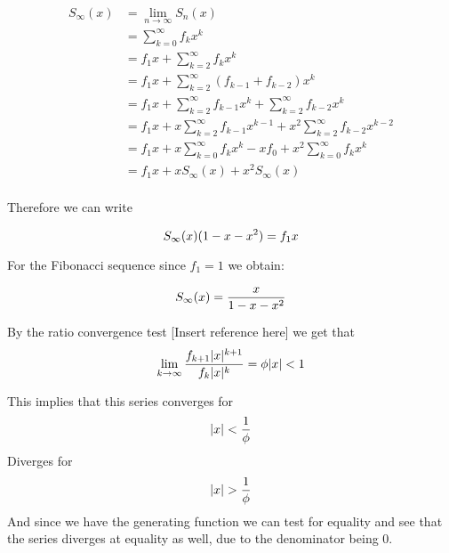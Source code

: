 \documentclass[a4paper]{article}
\begin{document}
\begin{equation}
\begin{split}
S_{\infty}(x) & = \lim_{n \to \infty} S_n(x) \\
 & = \sum_{k=0}^{\infty} f_k x^k \\
 & = f_1 x + \sum_{k=2}^{\infty} f_k x^k \\
 & = f_1 x + \sum_{k=2}^{\infty} (f_{k-1} + f_{k-2}) x^k \\ 
 & = f_1 x + \sum_{k=2}^{\infty} f_{k-1} x^k + \sum_{k=2}^{\infty} f_{k-2} x^k \\
  & = f_1 x + x \sum_{k=2}^{\infty} f_{k-1} x^{k-1} + x^2 \sum_{k=2}^{\infty} f_{k-2} x^{k-2} \\
  & = f_1 x + x \sum_{k=0}^{\infty} f_{k} x^{k} - x f_0 + x^2 \sum_{k=0}^{\infty} f_{k} x^{k} \\ 
  & = f_1 x + x S_{\infty}(x) + x^2 S_{\infty}(x) \\ 
\end{split}
\end{equation}

Therefore we can write 

\begin{equation}
S_{\infty}(x) (1 - x -x^2 ) = f_1 x \\ 
\end{equation}

For the Fibonacci sequence since $f_1 = 1$ we obtain:

\begin{equation}
S_{\infty}(x) = \frac{x}{1 - x -x^2 }  \\ 
\end{equation}

By the ratio convergence test [Insert reference here] 
we get that 
\begin{equation}
\lim_{k \to 
\infty} \frac{f_{k+1} |x|^{k+1}}{f_{k} |x|^{k}} = \phi |x| < 1 \\ 
\end{equation}

This implies that this series converges for 
\begin{equation}
|x| < \frac{1}{\phi} \\ 
\end{equation}
Diverges for 
\begin{equation}
|x| > \frac{1}{\phi} \\ 
\end{equation}
And since we have the generating function we can test for equality and see that the series diverges at equality as well, due to the denominator being 0.
\end{document}

